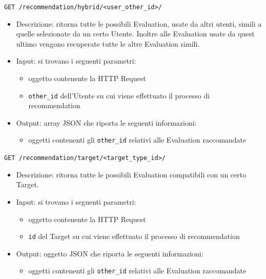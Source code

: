 \begin{description}
    \item[Richiesta al Hybrid Recommendation Algorithm]
    \item\texttt{GET /recommendation/hybrid/<user\_other\_id>/}
    \begin{itemize}
        \item Descrizione: ritorna tutte le possibili Evaluation, usate da altri utenti, simili a quelle selezionate da un certo Utente. 
        Inoltre alle Evaluation usate da quest ultimo vengono recuperate tutte le altre Evaluation simili.
        \item Input: si trovano i seguenti parametri:
        \begin{itemize}
            \item oggetto contenente la HTTP Request
            \item \texttt{other\_id} dell'Utente su cui viene effettuato il processo di recommendation
        \end{itemize}
        \item Output: array JSON che riporta le seguenti informazioni:
        \begin{itemize}
            \item oggetti contenenti gli \texttt{other\_id} relativi alle Evaluation raccomandate
        \end{itemize}
    \end{itemize}
 
    \item[Richiesta al Target Recommendation Algorithm]
    \item\texttt{GET /recommendation/target/<target\_type\_id>/}
    \begin{itemize}
        \item Descrizione: ritorna tutte le possibili Evaluation compatibili con un certo Target.
        \item Input: si trovano i seguenti parametri:
        \begin{itemize}
            \item oggetto contenente la HTTP Request
            \item \texttt{id} del Target su cui viene effettuato il processo di recommendation
        \end{itemize}
        \item Output: oggetto JSON che riporta le seguenti informazioni:
        \begin{itemize}
            \item oggetti contenenti gli \texttt{other\_id} relativi alle Evaluation raccomandate
        \end{itemize}
    \end{itemize}
\end{description}
